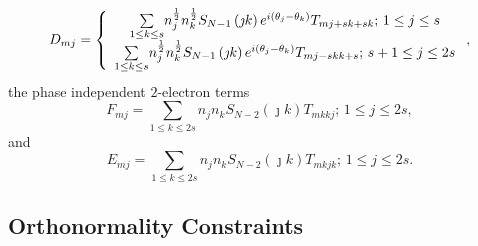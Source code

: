 \documentclass[aps,preprint]{revtex4}%
\begin{document}
\begin{equation}
D_{mj}=\left\{
\begin{array}
[c]{c}%
{\textstyle\sum\limits_{1\leq k\leq s}}
n_{j}^{\frac{1}{2}}n_{k}^{\frac{1}{2}}S_{N-1}\left(  \jmath k\right)
e^{i\left(  \theta_{j}-\theta_{k}\right)  }T_{mj+sk+sk};\,1\leq j\leq s\\%
{\textstyle\sum\limits_{1\leq k\leq s}}
n_{j}^{\frac{1}{2}}n_{k}^{\frac{1}{2}}S_{N-1}\left(  \jmath k\right)
e^{i\left(  \theta_{j}-\theta_{k}\right)  }T_{mj-skk+s};\,s+1\leq j\leq2s
\end{array}
\right.  , \label{d1}%
\end{equation}
the phase independent $2$-electron terms
\begin{equation}
F_{mj}=\sum_{1\leq k\leq2s}n_{j}n_{k}S_{N-2}\left(  \jmath k\right)
T_{mkkj};\,1\leq j\leq2s, \label{f1}%
\end{equation}
and%
\begin{equation}
E_{mj}=\sum_{1\leq k\leq2s}n_{j}n_{k}S_{N-2}\left(  \jmath k\right)
T_{mkjk};\,1\leq j\leq2s. \label{e1}%
\end{equation}


\subsection{Orthonormality Constraints}
\end{document}
